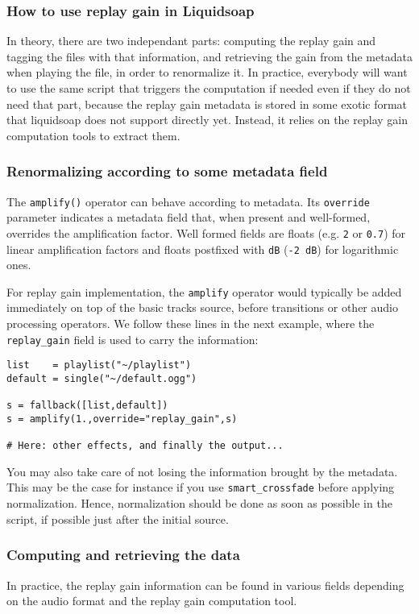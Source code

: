 \subsubsection{How to use replay gain in Liquidsoap}
In theory, there are two independant parts: computing the replay gain and
tagging the files with that information, and retrieving the gain from the
metadata when playing the file, in order to renormalize it. In practice,
everybody will want to use the same script that triggers the computation if
needed even if they do not need that part, because the replay gain metadata is
stored in some exotic format that liquidsoap does not support directly
yet. Instead, it relies on the replay gain computation tools to extract them.

\subsubsection{Renormalizing according to some metadata field}
The \verb+amplify()+ operator can behave according to metadata. Its
\verb+override+ parameter indicates a metadata field that, when present and
well-formed, overrides the amplification factor. Well formed fields are floats
(e.g. \verb+2+ or \verb+0.7+) for linear amplification factors and floats
postfixed with \verb+dB+ (\eg \verb+-2 dB+) for logarithmic ones.

For replay gain implementation, the \verb+amplify+ operator would typically be
added immediately on top of the basic tracks source, before transitions or other
audio processing operators. We follow these lines in the next example, where the
\verb+replay_gain+ field is used to carry the information:
\begin{verbatim}
list    = playlist("~/playlist")
default = single("~/default.ogg")

s = fallback([list,default])
s = amplify(1.,override="replay_gain",s)

# Here: other effects, and finally the output...
\end{verbatim}
You may also take care of not losing the information brought by the
metadata. This may be the case for instance if you use \verb+smart_crossfade+
before applying normalization. Hence, normalization should be done as soon as
possible in the script, if possible just after the initial source.

\subsubsection{Computing and retrieving the data}
In practice, the replay gain information can be found in various fields
depending on the audio format and the replay gain computation tool.

